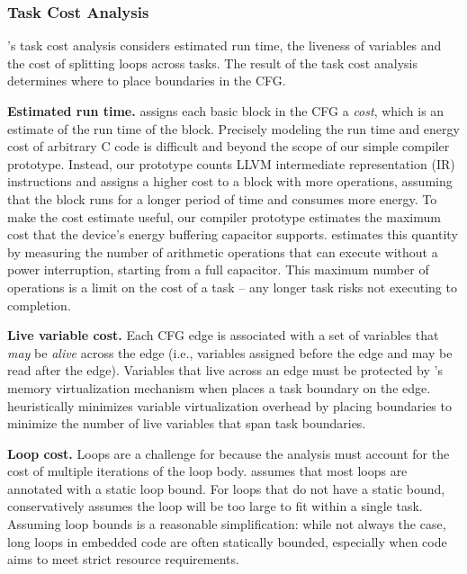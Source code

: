 %
%

\subsubsection{Task Cost Analysis}

\sys's task cost analysis considers estimated run time, the liveness of
variables and the cost of splitting loops across tasks. The result of the task
cost analysis determines where to place boundaries in the CFG.
 
{\noindent \bf Estimated run time.} \sys assigns each basic block in the CFG a
{\em cost}, which is an estimate of the run time of the block.  Precisely
modeling the run time and energy cost of arbitrary C code is difficult and
beyond the scope of our simple compiler prototype.  Instead, our prototype counts
LLVM intermediate representation (IR) instructions and assigns a higher cost to
a block with more operations, assuming that the block runs for a longer period
of time and consumes more energy.  
%
To make the cost estimate useful, our compiler prototype estimates the maximum
cost that the device's energy buffering capacitor supports.  \sys estimates
this quantity by measuring the number of arithmetic operations that can execute
without a power interruption, starting from a full capacitor. This maximum number
of operations is a limit on the cost of a task -- any longer task risks not
executing to completion.


{\noindent \bf Live variable cost.} Each CFG edge is associated with a set of
variables that {\em may} be {\em alive} across the edge (i.e., variables
assigned before the edge and may be read after the edge). Variables that live
across an edge must be protected by \sys's memory virtualization mechanism when
\sys places a task boundary on the edge.  \sys heuristically minimizes variable
virtualization overhead by placing boundaries to minimize the number of
live variables that span task boundaries.

{\noindent \bf Loop cost.} Loops are a challenge for \sys because the analysis
must account for the cost of multiple iterations of the loop body. \sys assumes
that most loops are annotated with a static loop bound. For loops that do not
have a static bound, \sys conservatively assumes the loop will be too large to
fit within a single task. Assuming loop bounds is a reasonable simplification:
while not always the case, long loops in embedded code are often statically
bounded, especially when code aims to meet strict resource requirements. 

